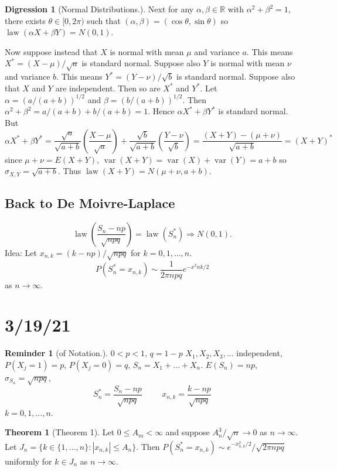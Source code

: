\documentclass{article}
\DeclareMathOperator{\law}{law}
\newcommand{\R}{\mathbb{R}}
\DeclareMathOperator{\var}{var}
\theoremstyle{definition}
\newtheorem{theorem}{Theorem}
\newtheorem*{reminder}{Reminder}
\newtheorem*{digression}{Digression}
\begin{document}
\begin{digression}[Normal Distributions.]
Next for any $\alpha, \beta \in \R$ with $\alpha^2 + \beta^2 = 1$, there exists $\theta \in [0, 2\pi)$ such that $(\alpha, \beta) = (\cos\theta, \sin\theta)$ so $\law(\alpha X + \beta Y) = N(0,1)$.

Now suppose instead that $X$ is normal with mean $\mu$ and variance $a$. This means $X^* = (X-\mu)/\sqrt{a}$ is standard normal. Suppose also $Y$ is normal with mean $\nu$ and variance $b$. This means $Y^* = (Y-\nu)/\sqrt{b}$ is standard normal. Suppose also that $X$ and $Y$ are independent. Then so are $X^*$ and $Y^*$. Let $\alpha = (a/(a+b))^{1/2}$ and $\beta = (b/(a+b))^{1/2}$. Then $\alpha^2 + \beta^2 = a/(a+b) + b/(a+b) = 1$. Hence $\alpha X^* + \beta Y^*$ is standard normal. But 
\[
    \alpha X^* + \beta Y^*
    = \frac{\sqrt{a}}{\sqrt{a+b}}\left(\frac{X-\mu}{\sqrt{a}}\right) + \frac{\sqrt{b}}{\sqrt{a+b}}\left(\frac{Y-\nu}{\sqrt{b}}\right)
    = \frac{(X+Y)-(\mu+\nu)}{\sqrt{a+b}} = (X+Y)^*
\]
since $\mu+\nu = E(X+Y)$, $\var(X+Y) = \var(X)+\var(Y) = a+b$ so $\sigma_{X,Y} = \sqrt{a+b}$. Thus $\law(X+Y) = N(\mu+\nu, a+b)$.
\end{digression}

\subsection*{Back to De Moivre-Laplace}
\[
    \law\left(\frac{S_n-np}{\sqrt{npq}}\right) = \law(S_n^*) \Rightarrow N(0,1).
\]
Idea: Let $x_{n,k} = (k-np)/\sqrt{npq}$ for $k = 0, 1, \dots, n$.
\[
    P(S_n^* = x_{n,k}) \sim \frac{1}{2\pi npq} e^{-x^2 nk/2}
\]
as $n \to \infty$.

\section*{3/19/21}

\begin{reminder}[of Notation.]
$0 < p < 1$, $q = 1 - p$ $X_1, X_2, X_3, \dots$ independent, $P(X_j = 1) = p$, $P(X_j = 0) = q$, $S_n = X_1 + \dots + X_n$. $E(S_n) = np$, $\sigma_{S_n} = \sqrt{npq}$,
\[
    S_n^* = \frac{S_n-np}{\sqrt{npq}} \hspace{1cm} x_{n,k} = \frac{k-np}{\sqrt{npq}}
\]
$k = 0, 1, \dots, n$.
\end{reminder}

\begin{theorem}[Theorem 1]
Let $0 \leq A_m < \infty$ and suppose $A_n^3/\sqrt{n} \to 0$ as $n \to \infty$. Let $J_n = \{k \in \{1, \dots, n\} : |x_{n,k}| \leq A_n\}$. Then $P(S_n^* = x_{n,k}) \sim e^{-x_{n,k}^2/2}/\sqrt{2\pi npq}$ uniformly for $k \in J_n$ as $n \to \infty$.
\end{theorem}
\end{document}
